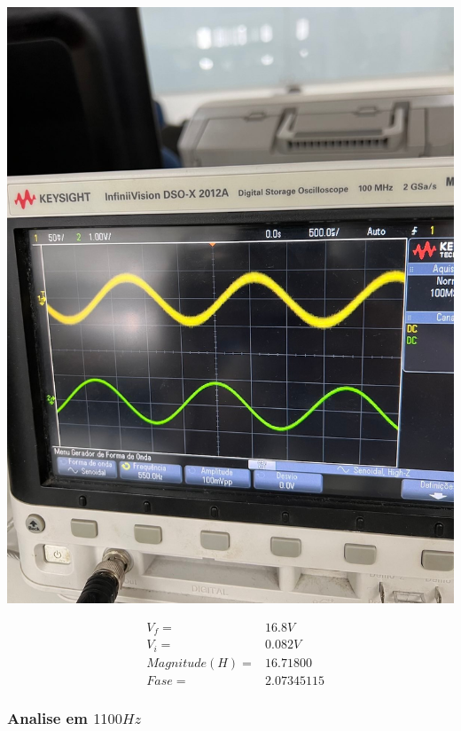\documentclass[12pt,twoside, a4paper, twocolumn]{article}
\begin{document}
\begin{adjustbox}{scale=0.18}
    \includegraphics{freq550.jpeg}
\end{adjustbox}


\begin{equation*}
    \begin{aligned}
         & V_f =          & 16.8V      \\
         & V_i =          & 0.082V     \\
         & Magnitude(H) = & 16.71800   \\
         & Fase =         & 2.07345115
    \end{aligned}
\end{equation*}


\subsubsection{Analise em $1100Hz$}
\subparagraph*{}
\end{document}
